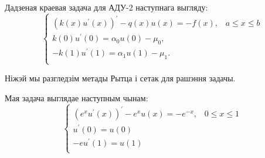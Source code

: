 Дадзеная краевая задача для АДУ-2 наступнага выгляду:
\begin{equation} \label{eq:adu2-problem}
    \begin{cases}
        (k(x)u^{\prime}(x))^{\prime} - q(x)u(x) = -f(x), \hspace{10pt} a \leq x \leq b \\
        k(0)u^{\prime}(0) = \alpha_{0}u(0) - \mu_{0}, \\
        -k(1)u^{\prime}(1) = \alpha_{1}u(1) - \mu_{1}. \\
    \end{cases}
\end{equation}

Ніжэй мы разгледзім метады Рытца і сетак для рашэння задачы.

Мая задача выглядае наступным чынам:
\begin{equation}
    \begin{cases}
        (e^{x}u^{\prime}(x))^{\prime} - e^{x}u(x) = -e^{-x}, \hspace{10pt} 0 \leq x \leq 1 \\
        u^{\prime}(0) = u(0) \\
        -eu^{\prime}(1) = u(1) \\
    \end{cases}
\end{equation}
